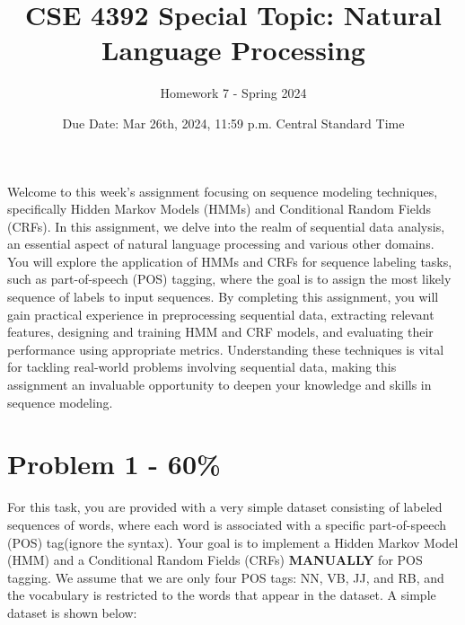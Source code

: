 \documentclass{article}
\begin{document}
\title{CSE 4392 Special Topic: Natural Language Processing}
\author{Homework 7 - Spring 2024}
\date{Due Date: Mar 26th, 2024, 11:59 p.m. Central Standard Time}
\maketitle
\thispagestyle{fancy}


Welcome to this week's assignment focusing on sequence modeling techniques, 
specifically Hidden Markov Models (HMMs) and Conditional Random Fields (CRFs). 
In this assignment, we delve into the realm of sequential data analysis, 
an essential aspect of natural language processing and various other domains. 
You will explore the application of HMMs and CRFs for sequence labeling tasks, 
such as part-of-speech (POS) tagging, 
where the goal is to assign the most likely sequence of labels to input sequences. 
By completing this assignment, 
you will gain practical experience in preprocessing sequential data, 
extracting relevant features, designing and training HMM and CRF models, 
and evaluating their performance using appropriate metrics. 
Understanding these techniques is vital for tackling real-world problems involving sequential data, 
making this assignment an invaluable opportunity to deepen your knowledge and skills in sequence modeling.

\section*{Problem 1 - 60\%}

For this task, you are provided with a very simple dataset consisting of labeled sequences of words, 
where each word is associated with a specific part-of-speech (POS) tag(ignore the syntax). 
Your goal is to implement a Hidden Markov Model (HMM) and a Conditional Random Fields (CRFs) 
\textbf{MANUALLY} for POS tagging. We assume that we are only four
POS tags: NN, VB, JJ, and RB, and the vocabulary is restricted to the words
that appear in the dataset. A simple dataset is shown below:
\end{document}
